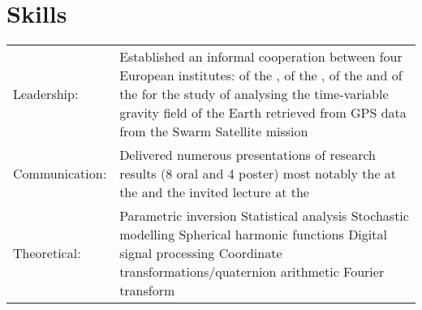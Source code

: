 \documentclass[a4paper]{article}
\newcommand{\dynhref}[2]{%
  \iftoggle{expliciturl}{%
    #2 (\href{#1}{\texttt{\detokenize{#1}}})%
  }{%
    \href{#1}{#2}%
  }%
}
\newlength{\listskipbig}
\newenvironment{cvsection}[2]{
  \vspace{0.15in}
  \section*{#1}
  \vspace{-0.2in}
  \begin{longtable}{lp{#2}}
}{
  \end{longtable}
}
\begin{document}

\clearpage

\begin{cvsection}{Skills}{11.2cm}
Leadership: & Established an informal cooperation between four European institutes:\newline
  \dynhref{http://www.itsg.tugraz.at}{Institute of Geodesy} of the \dynhref{http://www.tugraz.at}{Graz University of Technology}, \newline
  \dynhref{http://www.asu.cas.cz/en}{Astronomical Institute} of the \dynhref{http://www.cas.cz/index.html}{Academy of Sciences of the Czech Republic}, \newline
  \dynhref{http://www.aiub.unibe.ch}{Astronomical Institute of the University of Bern} \newline
  \dynhref{http://www.lr.tudelft.nl}{Aerospace Faculty} of the \dynhref{http://www.tudelft.nl}{Delft University of Technology} and\newline
  \dynhref{https://earthsciences.osu.edu}{School of Earth Sciences} of the \dynhref{https://www.osu.edu}{Ohio State University} \newline
  for the study of analysing the time-variable gravity field of the Earth retrieved from GPS data from the Swarm Satellite mission\\[\listskipbig]

Communication:  & Delivered numerous presentations of research results (8 oral and 4 poster)\newline
                  most notably the \dynhref{http://tinyurl.com/h928s3c}{invited talk} at the \dynhref{http://fallmeeting.agu.org/2015/}{American Geophysical Union Fall Meeting in 2015} and the invited lecture at the \dynhref{http://data-assimilation.com}{Summer School on Data Assimilation and its applications in Oceanography, Hydrology, Risk \& Safety and Reservoir Engineering in 2017}\\[\listskipbig]

Theoretical:   & Parametric inversion\newline
                 Statistical analysis\newline
                 Stochastic modelling\newline
                 Spherical harmonic functions\newline
                 Digital signal processing\newline
                 Coordinate transformations\slash quaternion arithmetic\newline
                 Fourier transform\\[\listskipbig]


\end{cvsection}
\end{document}
